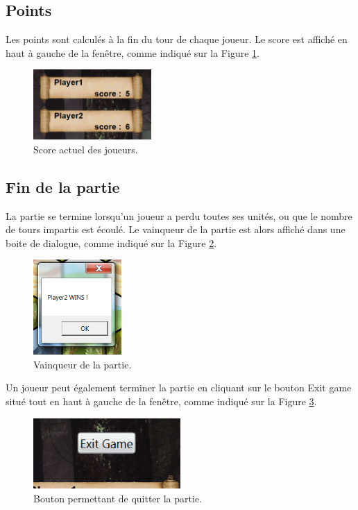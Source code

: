 		
		
		
		\subsection{Points}
		Les points sont calculés à la fin du tour de chaque joueur. Le score est affiché en haut à gauche de la fenêtre, comme indiqué sur la {\sc Figure }{\ref {fig:score}}.
		
		\begin{figure}
			\begin{center}
				\includegraphics[width=0.4\textwidth]{figure/score.png}
			\end{center}
			\caption{Score actuel des joueurs.}
			\label{fig:score}
		\end{figure}
		
		\subsection{Fin de la partie}
		La partie se termine lorsqu'un joueur a perdu toutes ses unités, ou que le nombre de tours impartis est écoulé. Le vainqueur de la partie est alors affiché dans une boite de dialogue, comme indiqué sur la {\sc Figure }{\ref {fig:end}}.
		
		\begin{figure}
			\begin{center}
				\includegraphics[width=0.3\textwidth]{figure/winner.png}
			\end{center}
			\caption{Vainqueur de la partie.}
			\label{fig:end}
		\end{figure}
		
		Un joueur peut également terminer la partie en cliquant sur le bouton \og Exit game \fg{} situé tout en haut à gauche de la fenêtre, comme indiqué sur la {\sc Figure }{\ref {fig:exit}}.
		
		\begin{figure}
			\begin{center}
				\includegraphics[width=0.5\textwidth]{figure/exit.png}
			\end{center}
			\caption{Bouton permettant de quitter la partie.}
			\label{fig:exit}
		\end{figure}